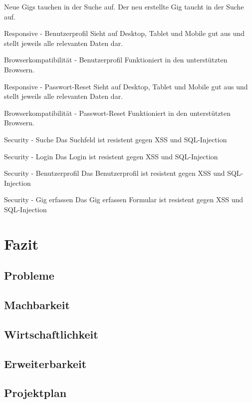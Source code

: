 \acceptancetest
  {Neue Gigs tauchen in der Suche auf.}
  {Der neu erstellte Gig taucht in der Suche auf.}

\clearpage

\acceptancetest
  {Responsive - Benutzerprofil}
  {Sieht auf Desktop, Tablet und Mobile gut aus und stellt jeweils alle relevanten Daten dar.}

\acceptancetest
  {Browserkompatibilität - Benutzerprofil}
  {Funktioniert in den unterstützten Browsern.}

\clearpage

\acceptancetest
  {Responsive - Passwort-Reset}
  {Sieht auf Desktop, Tablet und Mobile gut aus und stellt jeweils alle relevanten Daten dar.}

\acceptancetest
  {Browserkompatibilität - Passwort-Reset}
  {Funktioniert in den unterstützten Browsern.}

\clearpage

\acceptancetest
  {Security - Suche}
  {Das Suchfeld ist resistent gegen XSS und SQL-Injection}

\acceptancetest
  {Security - Login}
  {Das Login ist resistent gegen XSS und SQL-Injection}

\clearpage

\acceptancetest
  {Security - Benutzerprofil}
  {Das Benutzerprofil ist resistent gegen XSS und SQL-Injection}

\acceptancetest
  {Security - Gig erfassen}
  {Das Gig erfassen Formular ist resistent gegen XSS und SQL-Injection}

\clearpage
\section{Fazit}\label{konzept-fazit}

\subsection{Probleme}


\subsection{Machbarkeit}


\subsection{Wirtschaftlichkeit}


\subsection{Erweiterbarkeit}


\subsection{Projektplan}
